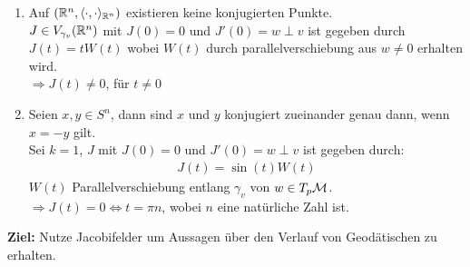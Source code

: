 \begin{bsp}
\begin{enumerate}
    \item Auf $(\mathbb{R}^n , \langle \cdot , \cdot \rangle_{\mathbb{R}^n})$ existieren keine konjugierten Punkte.\\
    $J\in V_{\gamma_v}(\mathbb{R}^n)$ mit $J(0)=0$ und $J'(0)=w \perp v$ 
    ist gegeben durch $J(t)=t W(t)$ wobei $W(t)$ durch parallelverschiebung aus 
    $w\neq 0$ erhalten wird.\\
    $\Rightarrow J(t)\neq 0$, für $t\neq 0 $
\item Seien $x, y \in S^n$, dann sind $x$ und $y$ konjugiert zueinander
    genau dann, wenn $x = -y$ gilt.\\
    Sei $k=1$, $J$ mit $J(0)=0$ und $J'(0)=w \perp v$ ist gegeben durch:
    \begin{align*}
        J(t) = \sin (t) W(t)
    \end{align*}
    $W(t)$ Parallelverschiebung entlang $\gamma_v$ von $w \in T_p\mathcal{M}$.\\
    $\Rightarrow J(t)=0 \Leftrightarrow t = \pi n$, wobei $n$ eine natürliche Zahl ist.
\end{enumerate}
\end{bsp}

\textbf{Ziel:}
Nutze Jacobifelder um Aussagen über den Verlauf von Geodätischen zu erhalten.

